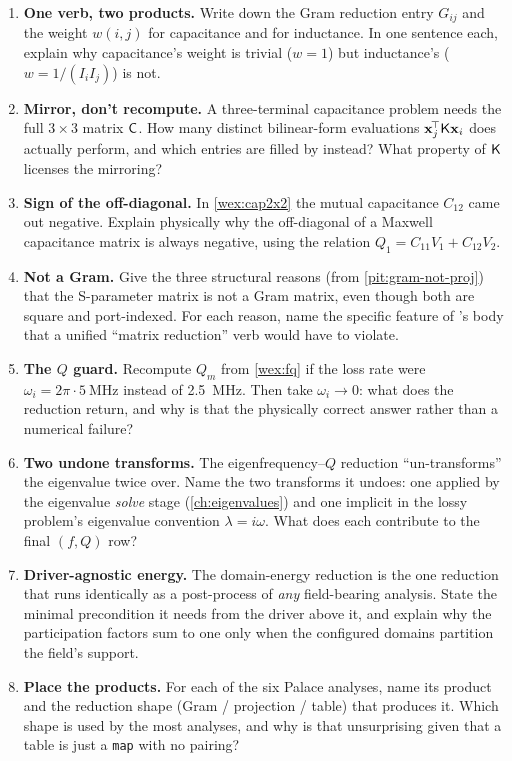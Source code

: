 \exercisessection
\begin{enumerate}[nosep]
  \item \textbf{One verb, two products.} Write down the Gram reduction entry
  $G_{ij}$ and the weight $w(i,j)$ for capacitance and for inductance. In one
  sentence each, explain why capacitance's weight is trivial ($w=1$) but
  inductance's ($w=1/(I_iI_j)$) is not.
  \item \textbf{Mirror, don't recompute.} A three-terminal capacitance problem
  needs the full $3\times 3$ matrix $\mathsf{C}$. How many distinct bilinear-form
  evaluations $\mathbf{x}_j^{\!\top}\mathsf{K}\mathbf{x}_i$ does  actually perform,
  and which entries are filled by  instead? What
  property of $\mathsf{K}$ licenses the mirroring?
  \item \textbf{Sign of the off-diagonal.} In \cref{wex:cap2x2} the mutual
  capacitance $C_{12}$ came out negative. Explain physically why the off-diagonal
  of a Maxwell capacitance matrix is always negative, using the relation
  $Q_1=C_{11}V_1+C_{12}V_2$.
  \item \textbf{Not a Gram.} Give the three structural reasons (from
  \cref{pit:gram-not-proj}) that the S-parameter matrix is not a Gram matrix,
  even though both are square and port-indexed. For each reason, name the specific
  feature of 's body that a unified ``matrix reduction''
  verb would have to violate.
  \item \textbf{The $Q$ guard.} Recompute $Q_m$ from \cref{wex:fq} if the loss
  rate were $\omega_i=2\pi\cdot\SI{5}{\mega\hertz}$ instead of \SI{2.5}{\mega\hertz}.
  Then take $\omega_i\to 0$: what does the reduction return, and why is that the
  physically correct answer rather than a numerical failure?
  \item \textbf{Two undone transforms.} The eigenfrequency--$Q$ reduction
  ``un-transforms'' the eigenvalue twice over. Name the two transforms it undoes:
  one applied by the eigenvalue \emph{solve} stage (\cref{ch:eigenvalues}) and one
  implicit in the lossy problem's eigenvalue convention $\lambda=i\omega$. What
  does each contribute to the final $(f,Q)$ row?
  \item \textbf{Driver-agnostic energy.} The domain-energy reduction is the one
  reduction that runs identically as a post-process of \emph{any} field-bearing
  analysis. State the minimal precondition it needs from the driver above it, and
  explain why the participation factors sum to one only when the configured
  domains partition the field's support.
  \item \textbf{Place the products.} For each of the six Palace analyses, name its
  product and the reduction shape (Gram / projection / table) that produces it.
  Which shape is used by the most analyses, and why is that unsurprising given
  that a table is just a \texttt{map} with no pairing?
\end{enumerate}
